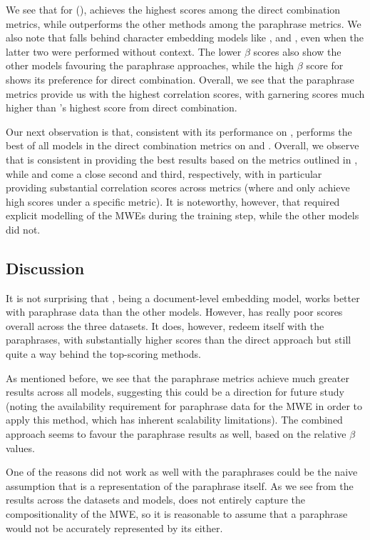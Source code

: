 We see that for \ramisch (), \wordtovec achieves the highest scores among the direct combination metrics, while \infersent outperforms the other methods among the paraphrase metrics. We also note that \wordtovec falls behind character embedding models like \fasttext, \elmo and \bert, even when the latter two were performed without context. The lower $\beta$ scores also show the other models favouring the paraphrase approaches, while the high $\beta$ score for \wordtovec shows its preference for direct combination. Overall, we see that the paraphrase metrics provide us with the highest correlation scores, with \infersent garnering scores much higher than \wordtovec's highest score from direct combination.

Our next observation is that, consistent with its performance on \ramisch, \wordtovec performs the best of all models in the direct combination metrics on \reddy and \discoj. Overall, we observe that \wordtovec is consistent in providing the best results based on the metrics outlined in , while \fasttext and \infersent come a close second and third, respectively, with \fasttext in particular providing substantial correlation scores across metrics (where \infersent and \wordtovec only achieve high scores under a specific metric). It is noteworthy, however, that \wordtovec required explicit modelling of the MWEs during the training step, while the other models did not.

\subsection*{Discussion}
It is not surprising that \infersent, being a document-level embedding model, works better with paraphrase data than the other models. However, \doctovec has really poor scores overall across the three datasets. It does, however, redeem itself with the paraphrases, with substantially higher scores than the direct approach but still quite a way behind the top-scoring methods. 

As mentioned before, we see that the paraphrase metrics achieve much greater results across all models, suggesting this could be a direction for future study (noting the availability requirement for paraphrase data for the MWE in order to apply this method, which has inherent scalability limitations). The combined approach seems to favour the paraphrase results as well, based on the relative $\beta$ values.

One of the reasons \wordtovec did not work as well with the paraphrases could be the naive assumption that \presum is a representation of the paraphrase itself. As we see from the results across the datasets and models, \presum does not entirely capture the compositionality of the MWE, so it is reasonable to assume that a paraphrase would not be accurately represented by  its \presum either. 

